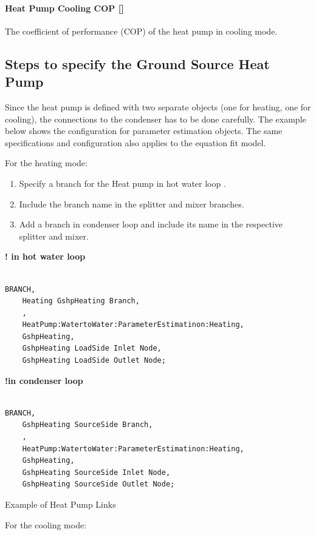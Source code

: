 \paragraph{Heat Pump Cooling COP {[}{]}} The coefficient of performance (COP) of
the heat pump in cooling mode.

\subsection{Steps to specify the Ground Source Heat Pump}\label{steps-to-specify-the-ground-source-heat-pump}

Since the heat pump is defined with two separate objects (one for heating, one for cooling), the connections to the condenser has to be done carefully. The example below shows the configuration for parameter estimation objects. The same specifications and configuration also applies to the equation fit model.

For the heating mode:

\begin{enumerate}
    \def\labelenumi{\arabic{enumi}.}
    \item
    Specify a branch for the Heat pump in hot water loop .
    \item
    Include the branch name in the splitter and mixer branches.
    \item
    Add a branch in condenser loop and include its name in the respective splitter and mixer.
\end{enumerate}

\textbf{! in hot water loop}

\begin{lstlisting}

BRANCH,
	Heating GshpHeating Branch,
    ,
    HeatPump:WatertoWater:ParameterEstimatinon:Heating,
    GshpHeating,
    GshpHeating LoadSide Inlet Node,
    GshpHeating LoadSide Outlet Node;
\end{lstlisting}

\textbf{!in condenser loop}

\begin{lstlisting}

BRANCH,
	GshpHeating SourceSide Branch,
    ,
    HeatPump:WatertoWater:ParameterEstimatinon:Heating,
    GshpHeating,
    GshpHeating SourceSide Inlet Node,
    GshpHeating SourceSide Outlet Node;
\end{lstlisting}

Example of Heat Pump Links

For the cooling mode:

